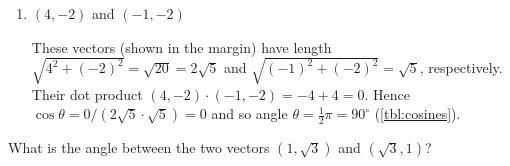 \begin{example}
\begin{enumerate}
\item \((4,-2)\) and \((-1,-2)\)
\begin{solution} 
These vectors (shown in the margin) 
%
have length \(\sqrt{4^2+(-2)^2}=\sqrt{20}=2\sqrt5\) and \(\sqrt{(-1)^2+(-2)^2}=\sqrt{5}\), respectively.
Their dot product  \((4,-2)\cdot(-1,-2)=-4+4=0\).
Hence \(\cos\theta =0/(2\sqrt{5}\cdot\sqrt5) =0\) and so angle \(\theta=\frac12\pi=90^\circ\) (\autoref{tbl:cosines}).
\end{solution}

\end{enumerate}
\end{example}



\begin{activity}
What is the angle between the two vectors \((1,\sqrt3)\) and \((\sqrt3,1)\)?
\end{activity}




